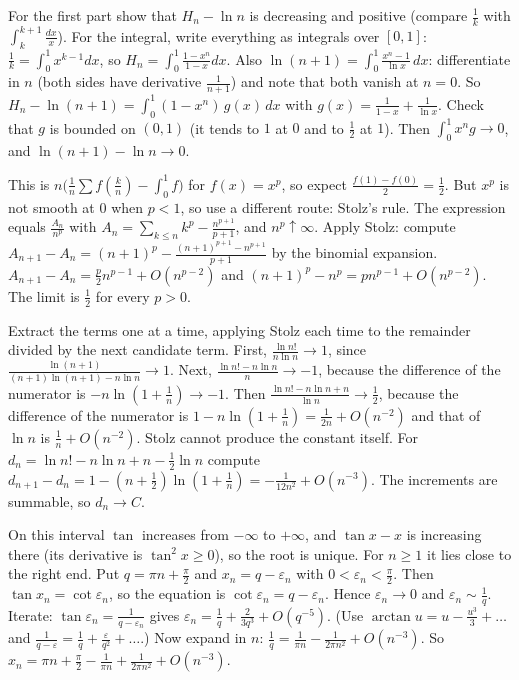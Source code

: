 \documentclass[11pt,a4paper]{article}
\begin{document}
 For the first part show that $H_n-\ln n$ is decreasing and positive (compare $\frac1k$ with $\int_k^{k+1}\frac{dx}x$). For the integral, write everything as integrals over $[0,1]$: $\frac1k=\int_0^1x^{k-1}dx$, so $H_n=\int_0^1\frac{1-x^n}{1-x}dx$.
 Also $\ln(n+1)=\int_0^1\frac{x^n-1}{\ln x}\,dx$: differentiate in $n$ (both sides have derivative $\frac1{n+1}$) and note that both vanish at $n=0$.
 So $H_n-\ln(n+1)=\int_0^1(1-x^n)\,g(x)\,dx$ with $g(x)=\frac1{1-x}+\frac1{\ln x}$. Check that $g$ is bounded on $(0,1)$ (it tends to $1$ at $0$ and to $\frac12$ at $1$). Then $\int_0^1x^ng\to0$, and $\ln(n+1)-\ln n\to0$.

 This is $n\bigl(\frac1n\sum f(\frac kn)-\int_0^1f\bigr)$ for $f(x)=x^p$, so expect $\frac{f(1)-f(0)}2=\frac12$. But $x^p$ is not smooth at $0$ when $p<1$, so use a different route: Stolz's rule.
 The expression equals $\frac{A_n}{n^p}$ with $A_n=\sum_{k\le n}k^p-\frac{n^{p+1}}{p+1}$, and $n^p\uparrow\infty$. Apply Stolz: compute $A_{n+1}-A_n=(n+1)^p-\frac{(n+1)^{p+1}-n^{p+1}}{p+1}$ by the binomial expansion.
 $A_{n+1}-A_n=\frac p2n^{p-1}+O(n^{p-2})$ and $(n+1)^p-n^p=pn^{p-1}+O(n^{p-2})$. The limit is $\frac12$ for every $p>0$.

 Extract the terms one at a time, applying Stolz each time to the remainder divided by the next candidate term. First, $\frac{\ln n!}{n\ln n}\to1$, since $\frac{\ln(n+1)}{(n+1)\ln(n+1)-n\ln n}\to1$.
 Next, $\frac{\ln n!-n\ln n}{n}\to-1$, because the difference of the numerator is $-n\ln(1+\frac1n)\to-1$. Then $\frac{\ln n!-n\ln n+n}{\ln n}\to\frac12$, because the difference of the numerator is $1-n\ln(1+\frac1n)=\frac1{2n}+O(n^{-2})$ and that of $\ln n$ is $\frac1n+O(n^{-2})$.
 Stolz cannot produce the constant itself. For $d_n=\ln n!-n\ln n+n-\frac12\ln n$ compute $d_{n+1}-d_n=1-(n+\frac12)\ln(1+\frac1n)=-\frac1{12n^2}+O(n^{-3})$. The increments are summable, so $d_n\to C$.

 On this interval $\tan$ increases from $-\infty$ to $+\infty$, and $\tan x-x$ is increasing there (its derivative is $\tan^2 x\ge0$), so the root is unique. For $n\ge1$ it lies close to the right end. Put $q=\pi n+\frac\pi2$ and $x_n=q-\varepsilon_n$ with $0<\varepsilon_n<\frac\pi2$.
 Then $\tan x_n=\cot\varepsilon_n$, so the equation is $\cot\varepsilon_n=q-\varepsilon_n$. Hence $\varepsilon_n\to0$ and $\varepsilon_n\sim\frac1q$. Iterate: $\tan\varepsilon_n=\frac1{q-\varepsilon_n}$ gives $\varepsilon_n=\frac1q+\frac{2}{3q^3}+O(q^{-5})$. (Use $\arctan u=u-\frac{u^3}3+\dots$ and $\frac1{q-\varepsilon}=\frac1q+\frac{\varepsilon}{q^2}+\dots$.)
 Now expand in $n$: $\frac1q=\frac1{\pi n}-\frac1{2\pi n^2}+O(n^{-3})$. So $x_n=\pi n+\frac\pi2-\frac1{\pi n}+\frac1{2\pi n^2}+O(n^{-3})$.
\end{document}
